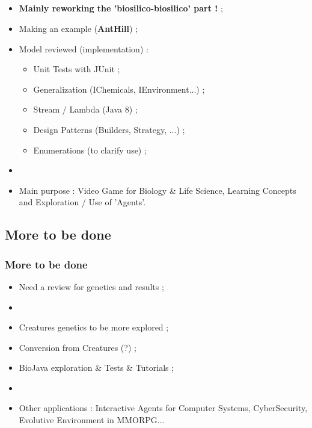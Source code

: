 \documentclass{beamer}
\begin{document}
\subsection{ \titleSubSectionThirdPartTwo }
\begin{frame}
	\frametitle{ \titleSubSectionThirdPartTwo }
	\begin{itemize}
		\item \textbf{Mainly reworking the 'biosilico-biosilico' part !} ; 
		\item Making an example (\textbf{AntHill}) ; 
		\item Model reviewed (implementation) : 
		\begin{itemize}
			\item Unit Tests with JUnit ; 
			\item Generalization (IChemicals, IEnvironment...) ; 
			\item Stream / Lambda (Java 8) ; 
			\item Design Patterns (Builders, Strategy, ...) ; 
			\item Enumerations (to clarify use) ; 
		\end{itemize}
		\item[] 
		\item Main purpose : Video Game for Biology \& Life Science, Learning Concepts and Exploration / Use of 'Agents'. 
	\end{itemize}
\end{frame}

\def\titleSubSectionThirdPartThree{ More to be done }
\subsection{ \titleSubSectionThirdPartThree }
\begin{frame}
	\frametitle{ \titleSubSectionThirdPartThree }
	\begin{itemize}
		\item Need a review for genetics and results ; 
		\item[] 
		\item Creatures genetics to be more explored ; 
		\item Conversion from Creatures (?) ; 
		\item BioJava exploration \& Tests \& Tutorials ; 
		\item[] 
		\item Other applications : Interactive Agents for Computer Systems, CyberSecurity, Evolutive Environment in MMORPG...
	\end{itemize}
\end{frame}
\end{document}
